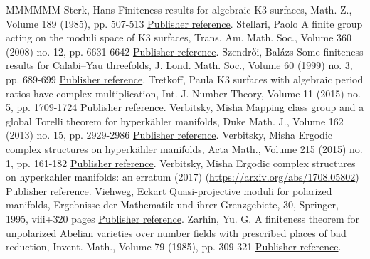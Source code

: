 \begin{thebibliography}{MMMMMM}
 Sterk, Hans Finiteness results for algebraic K3 surfaces, Math. Z., Volume 189 (1985), pp. 507-513 \href{https://ahl.centre-mersenne.org/item/AHL_2018__1__227_0/#Sterk}{Publisher reference}.
 Stellari, Paolo A finite group acting on the moduli space of K3 surfaces, Trans. Am. Math. Soc., Volume 360 (2008) no. 12, pp. 6631-6642 \href{https://ahl.centre-mersenne.org/item/AHL_2018__1__227_0/#Stel}{Publisher reference}.
 Szendrői, Balázs Some finiteness results for Calabi–Yau threefolds, J. Lond. Math. Soc., Volume 60 (1999) no. 3, pp. 689-699 \href{https://ahl.centre-mersenne.org/item/AHL_2018__1__227_0/#Szendroi}{Publisher reference}.
 Tretkoff, Paula K3 surfaces with algebraic period ratios have complex multiplication, Int. J. Number Theory, Volume 11 (2015) no. 5, pp. 1709-1724 \href{https://ahl.centre-mersenne.org/item/AHL_2018__1__227_0/#Tret}{Publisher reference}.
 Verbitsky, Misha Mapping class group and a global Torelli theorem for hyperkähler manifolds, Duke Math. J., Volume 162 (2013) no. 15, pp. 2929-2986 \href{https://ahl.centre-mersenne.org/item/AHL_2018__1__227_0/#Verb}{Publisher reference}.
 Verbitsky, Misha Ergodic complex structures on hyperkähler manifolds, Acta Math., Volume 215 (2015) no. 1, pp. 161-182 \href{https://ahl.centre-mersenne.org/item/AHL_2018__1__227_0/#Verb2}{Publisher reference}.
 Verbitsky, Misha Ergodic complex structures on hyperkahler manifolds: an erratum (2017) (\url{https://arxiv.org/abs/1708.05802}) \href{https://ahl.centre-mersenne.org/item/AHL_2018__1__227_0/#Verb3}{Publisher reference}.
 Viehweg, Eckart Quasi-projective moduli for polarized manifolds, Ergebnisse der Mathematik und ihrer Grenzgebiete, 30, Springer, 1995, viii+320 pages \href{https://ahl.centre-mersenne.org/item/AHL_2018__1__227_0/#Viehweg}{Publisher reference}.
 Zarhin, Yu. G. A finiteness theorem for unpolarized Abelian varieties over number fields with prescribed places of bad reduction, Invent. Math., Volume 79 (1985), pp. 309-321 \href{https://ahl.centre-mersenne.org/item/AHL_2018__1__227_0/#Zarhin}{Publisher reference}.
\end{thebibliography}
